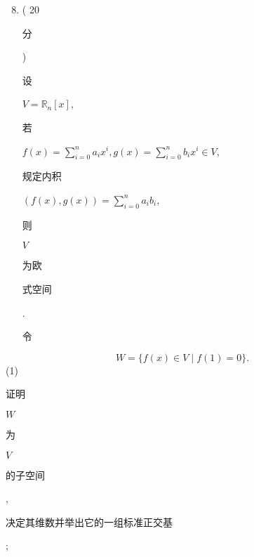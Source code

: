 \documentclass[10pt]{article}
\begin{document}
\begin{enumerate}
  \setcounter{enumi}{7}
  \item ( 20 \begin{CJK}{UTF8}{mj}分\end{CJK}) \begin{CJK}{UTF8}{mj}设\end{CJK} $V=\mathbb{R}_{n}[x]$, \begin{CJK}{UTF8}{mj}若\end{CJK} $f(x)=\sum_{i=0}^{n} a_{i} x^{i}, g(x)=\sum_{i=0}^{n} b_{i} x^{i} \in V$, \begin{CJK}{UTF8}{mj}规定内积\end{CJK} $(f(x), g(x))=\sum_{i=0}^{n} a_{i} b_{i}$, \begin{CJK}{UTF8}{mj}则\end{CJK} $V$ \begin{CJK}{UTF8}{mj}为欧\end{CJK} \begin{CJK}{UTF8}{mj}式空间\end{CJK}. \begin{CJK}{UTF8}{mj}令\end{CJK}
\end{enumerate}
$$
W=\{f(x) \in V \mid f(1)=0\} .
$$
(1) \begin{CJK}{UTF8}{mj}证明\end{CJK} $W$ \begin{CJK}{UTF8}{mj}为\end{CJK} $V$ \begin{CJK}{UTF8}{mj}的子空间\end{CJK}, \begin{CJK}{UTF8}{mj}决定其维数并举出它的一组标准正交基\end{CJK};
\end{document}
